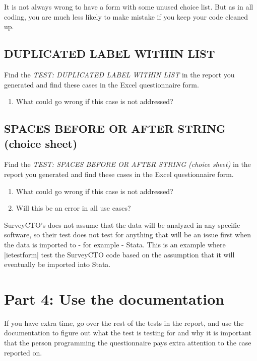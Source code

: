 \documentclass{tufte-handout}
\begin{document}
	\noindent It is not always wrong to have a form with some unused choice list. But as in all coding, you are much less likely to make mistake if you keep your code cleaned up.

\subsection{DUPLICATED LABEL WITHIN LIST}
	Find the \textit{TEST: DUPLICATED LABEL WITHIN LIST} in the report you generated and find these cases in the Excel questionnaire form.
	
	\begin{enumerate}
		\item What could go wrong if this case is not addressed?  
	\end{enumerate}

\subsection{SPACES BEFORE OR AFTER STRING (choice sheet)}
	Find the \textit{TEST: SPACES BEFORE OR AFTER STRING (choice sheet)} in the report you generated and find these cases in the Excel questionnaire form.
	
	\begin{enumerate}
		\item What could go wrong if this case is not addressed?   
		\item Will this be an error in all use cases? 
	\end{enumerate}

	SurveyCTO's does not assume that the data will be analyzed in any specific software, so their test does not test for anything that will be an issue first when the data is imported to - for example - Stata. This is an example where |ietestform| test the SurveyCTO code based on the assumption that it will eventually be imported into Stata.

\section{Part 4: Use the documentation}
If you have extra time, go over the rest of the tests in the report, and use the documentation to figure out what the test is testing for and why it is important that the person programming the questionnaire pays extra attention to the case reported on. 
\end{document}
